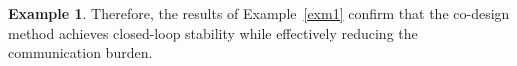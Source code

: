 \documentclass[preprint,review,fleqn,sort&compress,3p]{elsarticle}
\theoremstyle{definition} %
\theoremstyle{definition}%
\newtheorem{example}{Example}
\begin{document}
\begin{example}

Therefore, the results of Example~\ref{exm1} confirm that the co-design method achieves closed-loop stability while effectively reducing the communication burden.

\end{example}
\end{document}
